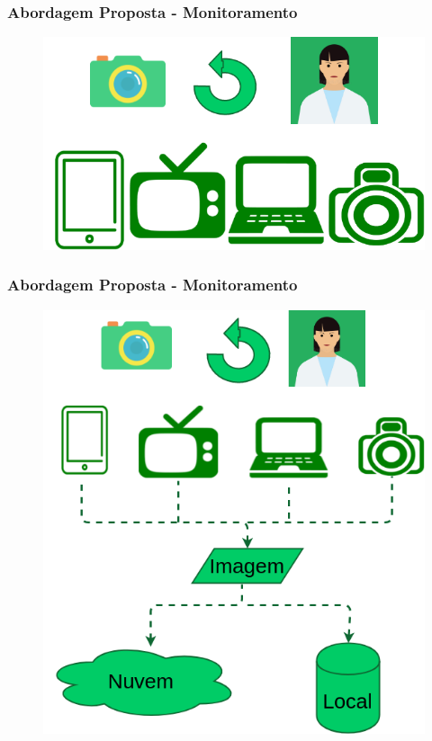 \documentclass{beamer}
\begin{document}
\begin{frame}
\frametitle{Abordagem Proposta - Monitoramento }
\begin{figure}
\centering
\includegraphics[scale=0.37]{figuras/monitoramento_2.png}
\label{fig:arquitetura1}
\end{figure}
\end{frame}

\begin{frame}
\frametitle{Abordagem Proposta - Monitoramento }
\begin{figure}
\centering
\includegraphics[scale=0.37]{figuras/monitoramento_3.png}
\label{fig:arquitetura1}
\end{figure}
\end{frame}
\end{document}
